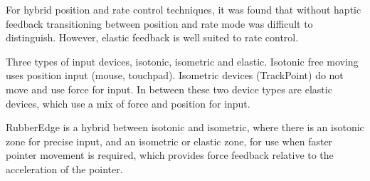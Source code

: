 For hybrid position and rate control techniques, it was found that without haptic feedback transitioning between position and rate mode was difficult to distinguish. However, elastic feedback is well suited to rate control.

Three types of input devices, isotonic, isometric and elastic. Isotonic free moving uses position input (mouse, touchpad). Isometric devices (TrackPoint)\cite{ZhaiHumanControl} do not move and use force for input. In between these two device types are elastic devices, which use a mix of force and position for input.

RubberEdge is a hybrid between isotonic and isometric, where there is an isotonic zone for precise input, and an isometric or elastic zone, for use when faster pointer movement is required, which provides force feedback relative to the acceleration of the pointer.